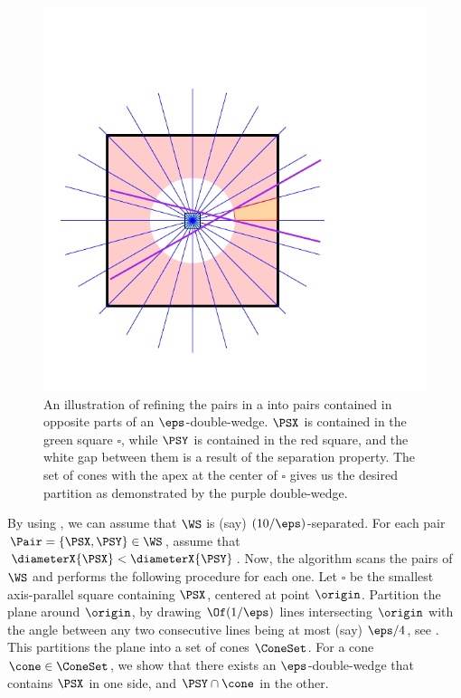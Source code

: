                 \begin{figure}[ht]
                        \centerline{\includegraphics{../figs/partition}}
                        \caption{An illustration of refining the pairs in a \SSPD into
                                pairs contained in opposite parts of an
                                $\eps$-double-wedge. $\PSX$ is contained in the green square
                                $\square$, while $\PSY$ is contained in the red square, and the
                                white gap between them is a result of the separation
                                property. The set of cones with the apex at the center of
                                $\square$ gives us the desired partition as demonstrated by the
                                purple double-wedge. }
                \end{figure}
        
                By using , we can assume that $\WS$ is (say)
                $(10/\eps)$-separated. For each pair
                $\Pair = \{ \PSX, \PSY \} \in \WS$, assume that
                $\diameterX{\PSX} < \diameterX{\PSY}$. Now, the algorithm scans
                the pairs of $\WS$ and performs the following procedure for each
                one. Let $\square$ be the smallest axis-parallel square containing
                $\PSX$, centered at point $\origin$. Partition the plane around
                $\origin$, by drawing $\Of(1/\eps)$ lines intersecting $\origin$
                with the angle between any two consecutive lines being at most
                (say) $\eps/4$, see . This partitions the plane
                into a set of cones $\ConeSet$. For a cone $\cone \in \ConeSet$,
                we show that there exists an $\eps$-double-wedge that contains
                $\PSX$ in one side, and $\PSY \cap \cone$ in the other.
                
